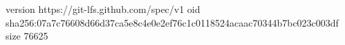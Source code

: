 version https://git-lfs.github.com/spec/v1
oid sha256:07a7c76608d66d37ca5e8c4e0e2ef76c1c0118524acaac70344b7bc023c003df
size 76625
